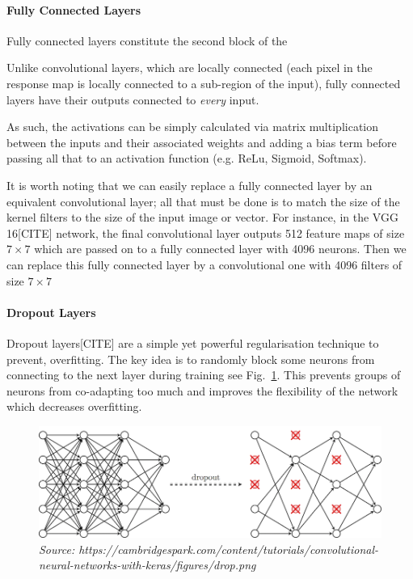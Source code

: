 \documentclass[12pt,twoside]{article}
\newcommand{\source}[1]{\vspace{-3pt} \caption*{ \footnotesize{\textit{Source: {#1}}}} }
\begin{document}
\paragraph{Fully Connected Layers}

Fully connected layers constitute the second block of the 

Unlike convolutional layers, which are locally connected (each pixel in the
response map is locally connected to a sub-region of the input), fully
connected layers have their outputs connected to \textit{every} input.

As such, the activations can be simply calculated via matrix multiplication
between the inputs and their associated weights and adding a bias term before
passing all that to an activation function (e.g. ReLu, Sigmoid, Softmax).

It is worth noting that we can easily replace a fully connected layer by an
equivalent convolutional layer; all that must be done is to match the size of
the kernel filters to the size of the input image or vector. For instance, in
the VGG 16[CITE] network, the final convolutional layer outputs 512 feature maps of
size $7 \times 7$ which are passed on to a fully connected layer with 4096
neurons. Then we can replace this fully connected layer by a convolutional one
with 4096 filters of size $7 \times 7$

\paragraph{Dropout Layers}

Dropout layers[CITE] are a simple yet powerful regularisation technique to prevent,
overfitting. The key idea is to randomly block some neurons from connecting to
the next layer during training see Fig.~\ref{fig:dropout}. This prevents groups of neurons from
co-adapting too much and improves the flexibility of the network which
decreases overfitting.


\begin{figure}[ht]
  \centering
  \includegraphics[scale=1.5]{./figures/dropout.png}
  \caption{example dropout layers: the crossed neurons are blocked from sending
  their inputs to the next layer}
  \source{https://cambridgespark.com/content/tutorials/convolutional-neural-networks-with-keras/figures/drop.png}
  \label{fig:dropout}
\end{figure}
\end{document}
